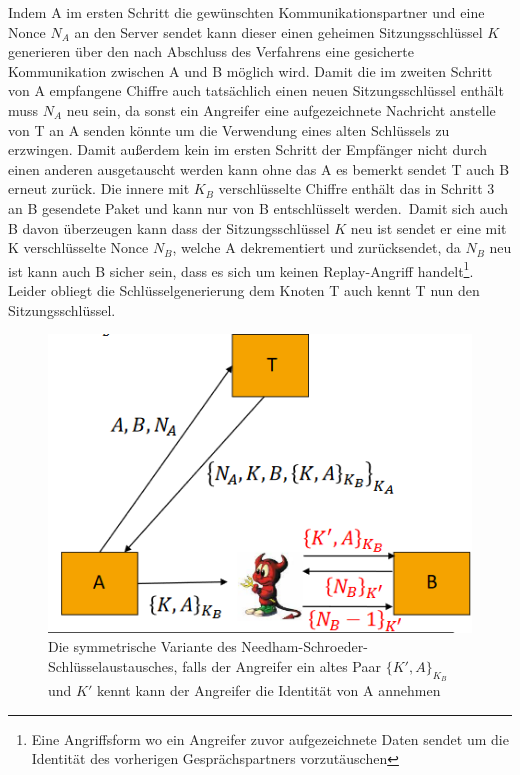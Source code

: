 \documentclass[a4paper,12pt,leqno]{article}
\begin{document}
Indem A im ersten Schritt die gewünschten Kommunikationspartner und eine Nonce $N_A$ an den Server sendet kann dieser einen geheimen Sitzungsschlüssel $K$ generieren über den nach Abschluss des Verfahrens eine gesicherte Kommunikation zwischen A und B möglich wird. Damit die im zweiten Schritt von A empfangene Chiffre auch tatsächlich einen neuen Sitzungsschlüssel enthält muss $N_A$ neu sein, da sonst ein Angreifer eine aufgezeichnete Nachricht anstelle von T an A senden könnte um die Verwendung eines alten Schlüssels zu erzwingen. Damit außerdem kein im ersten Schritt der Empfänger nicht durch einen anderen ausgetauscht werden kann ohne das A es bemerkt sendet T auch B erneut zurück. Die innere mit $K_B$ verschlüsselte Chiffre enthält das in Schritt 3 an B gesendete Paket und kann nur von B entschlüsselt werden.\
Damit sich auch B davon überzeugen kann dass der Sitzungsschlüssel $K$ neu ist sendet er eine mit K verschlüsselte Nonce $N_B$, welche A dekrementiert und zurücksendet, da $N_B$ neu ist kann auch B sicher sein, dass es sich um keinen Replay-Angriff handelt\footnote{Eine Angriffsform wo ein Angreifer zuvor aufgezeichnete Daten sendet um die Identität des vorherigen Gesprächspartners vorzutäuschen}.\\
Leider obliegt die Schlüsselgenerierung dem Knoten T auch kennt T nun den Sitzungsschlüssel.

\begin{figure}
\centering
\includegraphics[scale=0.6]{Grafiken/NeedhamSchroederSymmetrisch.png}
\caption{Die symmetrische Variante des Needham-Schroeder-Schlüsselaustausches, falls der Angreifer ein altes Paar $\{K',A\}_{K_B}$ und $K'$ kennt kann der Angreifer die Identität von A annehmen}
\end{figure}
\end{document}
